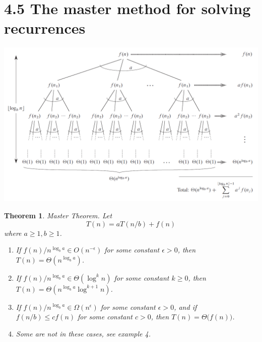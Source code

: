 \documentclass[a4paper]{article}
\theoremstyle{plain}
\newtheorem*{theorem*}{Theorem}
\begin{document}
\section*{4.5 The master method for solving recurrences}
\includegraphics[scale=0.4]{"Master-Theorem"}
\begin{theorem*}
Master Theorem. Let
\begin{equation*}
    T(n) = aT(n/b) + f(n)
\end{equation*}
where $a\geq 1,b\geq 1$.
\begin{enumerate}
    \item If $f(n)/{n^{\log_b{a}}}\in O(n^{-\epsilon})$ for some constant $\epsilon>0$, then $T(n)=\Theta(n^{\log_b{a}})$.
    \item If $f(n)/{n^{\log_b{a}}}\in \Theta({\log^k{n}})$ for some constant $k\geq 0$, then $T(n)=\Theta(n^{\log_b{a}} {\log^{k+1}{n}})$.
    \item If $f(n)/{n^{\log_b{a}}}\in \Omega(n^{\epsilon})$ for some constant $\epsilon>0$, and if $f(n/b)\leq cf(n)$ for some constant $c>0$, then $T(n)=\Theta\bigl(f(n)\bigr)$.
    \item Some are not  in these cases, see example 4.
\end{enumerate}
\end{theorem*}
\end{document}
